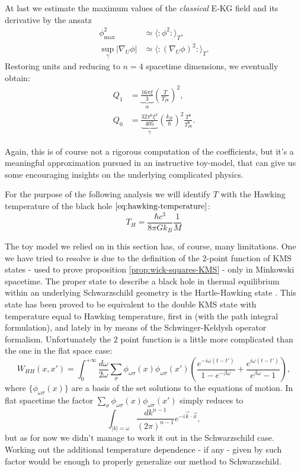 At last we estimate the maximum values of the \emph{classical} E-KG field and its derivative by the ansatz 
\begin{align*}
	\phi_{\max}^2 &\simeq \langle \colon \phi^2 \colon\rangle_T,\\
	\sup_{\gamma}\vert \nabla_U\phi\vert &\simeq \langle \colon (\nabla_U\phi)^2 \colon\rangle_T.
\end{align*}
Restoring units and reducing to \(n = 4\) spacetime dimensions, we eventually obtain:
\begin{align}
	\label{eq:KMS_Q_1}
    Q_1 &= \underbrace{\frac{16\pi\xi}{3}}_{\alpha} \left(\frac{T}{T_{Pl}}\right)^2,\\
    Q_0 &= \underbrace{\frac{32\pi^6\xi^3}{405}}_{\gamma}\left(\frac{k_B}{\hbar}\right)^2 \frac{T^8}{T_{Pl}^6}.
\end{align}

Again, this is of course not a rigorous computation of the coefficients, but it's a meaningful approximation pursued in an instructive toy-model, that can give us some encouraging insights on the underlying complicated physics.

For the purpose of the following analysis we will identify \(T\) with the Hawking temperature of the black hole \(\eqref{eq:hawking-temperature}\):
\[
T_H = \frac{\hbar c^3}{8\pi Gk_B}\frac{1}{M}    
\]
    
\begin{remark}
	The toy model we relied on in this section has, of course, many limitations. One we have tried to resolve is due to the definition of the \(2\)-point function of KMS states - used to prove proposition \ref{prop:wick-squares-KMS} - only in Minkowski spacetime. The proper state to describe a black hole in thermal equilibrium within an underlying Schwarzschild geometry is the Hartle-Hawking state \cite[]{hartle1993path}. This state has been proved to be equivalent to the double KMS state with temperature equal to Hawking temperature, first in \cite[]{jacobson1994note, sanders2015construction} (with the path integral formulation), and lately in \cite[]{higuchi2022hartle} by means of the Schwinger-Keldysh operator formalism. Unfortunately the \(2\) point function is a little more complicated than the one in the flat space case:
	\[
	W_{HH}(x, x') = \int_{0}^{+\infty} \frac{d\omega}{2\omega} \sum_{\sigma}\phi_{\omega\sigma}(x)\phi_{\omega\sigma}(x')\left(\frac{e^{-i\omega(t - t')}}{1 - e^{-\beta \omega}} + \frac{e^{i\omega(t - t')}}{e^{\beta \omega} - 1}\right),
	\]
	where \(\{\phi_{\omega\sigma}(x)\}\) are a basis of the set solutions to the equations of motion. In flat spacetime the factor \(\sum_{\sigma}\phi_{\omega\sigma}(x)\phi_{\omega\sigma}(x')\) simply reduces to 
	\[
		\int_{\vert k \vert = \omega}	\frac{dk^{n - 1}}{(2\pi)^{n - 1}} e^{-i\vec{k}\cdot \vec{x}},
	\]
	but as for now we didn't manage to work it out in the Schwarzschild case. Working out the additional temperature dependence - if any - given by such factor would be enough to properly generalize our method to Schwarzschild.
\end{remark}

